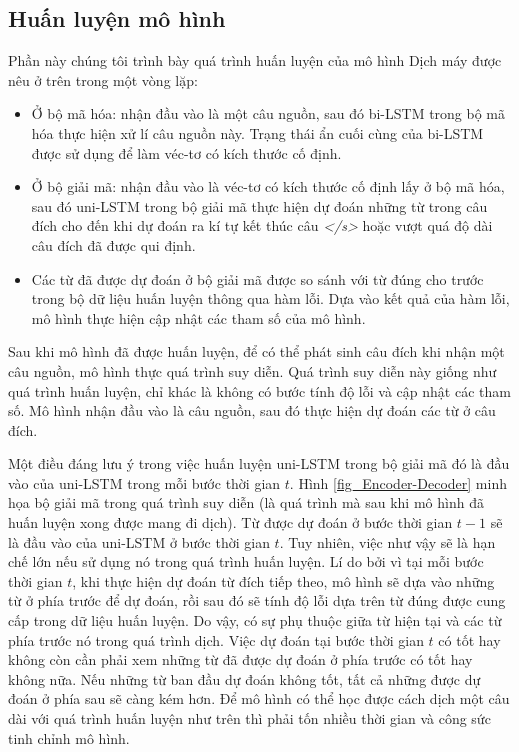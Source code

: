 \subsection{Huấn luyện mô hình}
Phần này chúng tôi trình bày quá trình huấn luyện của mô hình Dịch máy được nêu ở trên trong một vòng lặp:
\begin{itemize}
	\item Ở bộ mã hóa: nhận đầu vào là một câu nguồn, sau đó bi-LSTM trong bộ mã hóa thực hiện xử lí câu nguồn này. Trạng thái ẩn cuối cùng của bi-LSTM được sử dụng để làm véc-tơ có kích thước cố định.
	\item Ở bộ giải mã: nhận đầu vào là véc-tơ có kích thước cố định lấy ở bộ mã hóa, sau đó uni-LSTM trong bộ giải mã thực hiện dự đoán những từ trong câu đích cho đến khi dự đoán ra kí tự kết thúc câu \textit{</s>} hoặc vượt quá độ dài câu đích đã được qui định.
	\item Các từ đã được dự đoán ở bộ giải mã được so sánh với từ đúng cho trước trong bộ dữ liệu huấn luyện thông qua hàm lỗi. Dựa vào kết quả của hàm lỗi, mô hình thực hiện cập nhật các tham số của mô hình.
\end{itemize}

Sau khi mô hình đã được huấn luyện, để có thể phát sinh câu đích khi nhận một câu nguồn, mô hình thực quá trình suy diễn. Quá trình suy diễn này giống như quá trình huấn luyện, chỉ khác là không có bước tính độ lỗi và cập nhật các tham số. Mô hình nhận đầu vào là câu nguồn, sau đó thực hiện dự đoán các từ ở câu đích.

Một điều đáng lưu ý trong việc huấn luyện uni-LSTM trong bộ giải mã đó là đầu vào của uni-LSTM trong mỗi bước thời gian $t$. Hình \ref{fig_Encoder-Decoder} minh họa bộ giải mã trong quá trình suy diễn (là quá trình mà sau khi mô hình đã huấn luyện xong được mang đi dịch). Từ được dự đoán ở bước thời gian $t-1$ sẽ là đầu vào của uni-LSTM ở bước thời gian $t$. Tuy nhiên, việc như vậy sẽ là hạn chế lớn nếu sử dụng nó trong quá trình huấn luyện. Lí do bởi vì tại mỗi bước thời gian $t$, khi thực hiện dự đoán từ đích tiếp theo, mô hình sẽ dựa vào những từ ở phía trước để dự đoán, rồi sau đó sẽ tính độ lỗi dựa trên từ đúng được cung cấp trong dữ liệu huấn luyện. Do vậy, có sự phụ thuộc giữa từ hiện tại và các từ phía trước nó trong quá trình dịch. Việc dự đoán tại bước thời gian $t$ có tốt hay không còn cần phải xem những từ đã được dự đoán ở phía trước có tốt hay không nữa. Nếu những từ ban đầu dự đoán không tốt, tất cả những được dự đoán ở phía sau sẽ càng kém hơn. Để mô hình có thể học được cách dịch một câu dài với quá trình huấn luyện như trên thì phải tốn nhiều thời gian và công sức tinh chỉnh mô hình.
 
